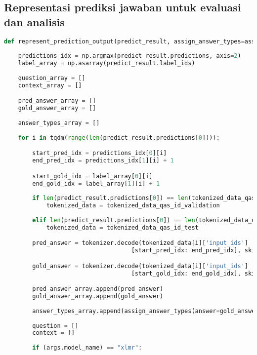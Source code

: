 \subsection{Representasi prediksi jawaban untuk evaluasi dan analisis}
\begin{lstlisting}[language=Python, caption=Representasi prediksi jawaban untuk evaluasi dan analisis]
def represent_prediction_output(predict_result, assign_answer_types=assign_answer_types):
        
    predictions_idx = np.argmax(predict_result.predictions, axis=2)
    label_array = np.asarray(predict_result.label_ids)
        
    question_array = []
    context_array = []

    pred_answer_array = []
    gold_answer_array = []
    
    answer_types_array = []
    
    for i in tqdm(range(len(predict_result.predictions[0]))):

        start_pred_idx = predictions_idx[0][i]
        end_pred_idx = predictions_idx[1][i] + 1

        start_gold_idx = label_array[0][i]
        end_gold_idx = label_array[1][i] + 1
        
        if len(predict_result.predictions[0]) == len(tokenized_data_qas_id_validation):
            tokenized_data = tokenized_data_qas_id_validation
        
        elif len(predict_result.predictions[0]) == len(tokenized_data_qas_id_test):
            tokenized_data = tokenized_data_qas_id_test

        pred_answer = tokenizer.decode(tokenized_data[i]['input_ids']
                                    [start_pred_idx: end_pred_idx], skip_special_tokens=True)

        gold_answer = tokenizer.decode(tokenized_data[i]['input_ids']
                                    [start_gold_idx: end_gold_idx], skip_special_tokens=True)

        pred_answer_array.append(pred_answer)
        gold_answer_array.append(gold_answer)
        
        answer_types_array.append(assign_answer_types(answer=gold_answer))
        
        question = []
        context = []
        
        if (args.model_name) == "xlmr":
            

\end{lstlisting}
